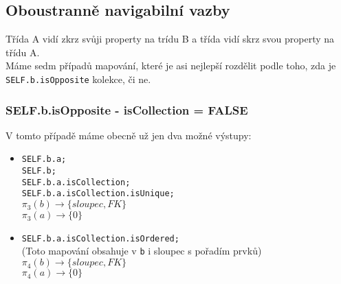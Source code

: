 \documentclass[11pt,a4paper]{article}
\begin{document}
   	\subsection{Oboustranně navigabilní vazby}
   		Třída A vidí zkrz svůji property na trídu B a třída vidí skrz svou property na třídu A. \\
   		Máme sedm případů mapování, které je asi nejlepší rozdělit podle toho, zda je \texttt   {SELF.b.isOpposite} kolekce, či ne.
   		\subsubsection{SELF.b.isOpposite - isCollection = FALSE}
   		V tomto případě máme obecně už jen dva možné výstupy:
   		   		\begin{itemize}				    
         			\item \texttt	{SELF.b.a; \\
         							 SELF.b; \\
         							 SELF.b.a.isCollection;\\
         							 SELF.b.a.isCollection.isUnique;\\
         							$\pi_3(b) \to \{ sloupec, FK\}$ \\
         							$\pi_3(a) \to \{ 0\}$
         							}
         			\item \texttt	{SELF.b.a.isCollection.isOrdered; \\}
         							(Toto mapování obsahuje v \texttt {b} i sloupec s pořadím prvků) \\
         							$\pi_4(b) \to \{ sloupec, FK\}$ \\
         							$\pi_4(a) \to \{ 0\}$  		  							
   				\end{itemize}
\end{document}
